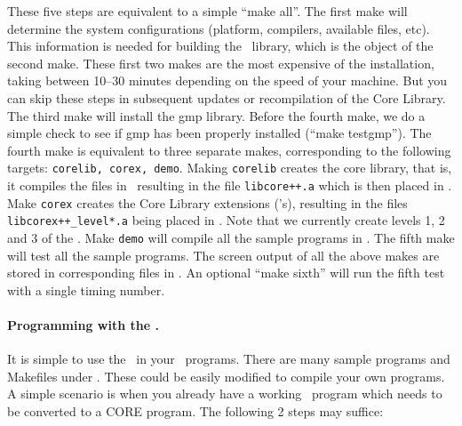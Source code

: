 \documentclass[12pt]{article}
\begin{document}
These five steps are equivalent to a simple ``make all''.
The first make will determine the system
configurations (platform, compilers, available files, etc).  
This information is needed for building the \gmp\ library,
which is the object of the second make.
These first two makes are the most expensive of the
installation, taking between 10--30 minutes depending on
the speed of your machine.  But you
can skip these steps in subsequent updates or
recompilation of the Core Library.
The third make will install the gmp library.
Before the fourth make, we do a simple check
to see if gmp has been properly installed (``make testgmp'').
The fourth make is equivalent to three separate makes,
corresponding to the following targets: {\tt corelib, corex, demo}.
Making {\tt corelib} creates the core library,
that is, it compiles the files in \srcdir\ resulting in the
file {\tt libcore++.a} which is then placed in \libdir.
Make {\tt corex} creates the Core Library extensions (\corex's),
resulting in the files {\tt libcorex++\_level*.a} being
placed in \libdir.  Note that we currently create
levels 1, 2 and 3 of the \corex.  Make {\tt demo} 
will compile all the sample programs in \examplesdir.
The fifth make will test all the sample programs.
The screen output of all the above makes are stored in
corresponding files in \tempdir.
An optional ``make sixth'' will run the fifth test with a single
timing number.  

\paragraph{Programming with the \corelib.}
\label{sec-prog-core}
It is simple to use the \corelib\ in your \candcpp\ programs. 
There are many sample programs and Makefiles under \examplesdir.
These could be easily modified to compile your own programs.
A simple scenario is when you already have
a working \cpp\ program which needs to be converted to
a CORE program.  The following 2 steps may suffice:
\end{document}
